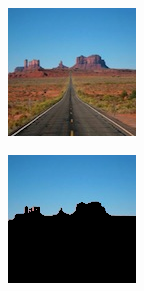 \begin{figure}
    \centering
    \begin{subfigure}{0.31\textwidth}
        \includegraphics[width=\textwidth]{figures/RegMon.png}
    \end{subfigure}
   \hspace*{\fill}
    \begin{subfigure}{0.31\textwidth}
        \includegraphics[width=\textwidth]{figures/NegMon.png}

\end{subfigure}
\end{figure}
